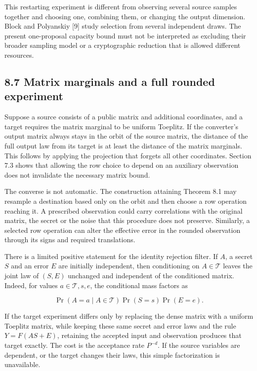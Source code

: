 \documentclass[
]{article}
\begin{document}
This restarting experiment is different from observing several source
samples together and choosing one, combining them, or changing the
output dimension. Block and Polyanskiy {[}9{]} study selection from
several independent draws. The present one-proposal capacity bound must
not be interpreted as excluding their broader sampling model or a
cryptographic reduction that is allowed different resources.

\subsection{8.7 Matrix marginals and a full rounded
experiment}\label{matrix-marginals-and-a-full-rounded-experiment}

Suppose a source consists of a public matrix and additional coordinates,
and a target requires the matrix marginal to be uniform Toeplitz. If the
converter's output matrix always stays in the orbit of the source
matrix, the distance of the full output law from its target is at least
the distance of the matrix marginals. This follows by applying the
projection that forgets all other coordinates. Section 7.3 shows that
allowing the row choice to depend on an auxiliary observation does not
invalidate the necessary matrix bound.

The converse is not automatic. The construction attaining Theorem 8.1
may resample a destination based only on the orbit and then choose a row
operation reaching it. A prescribed observation could carry correlations
with the original matrix, the secret or the noise that this procedure
does not preserve. Similarly, a selected row operation can alter the
effective error in the rounded observation through its signs and
required translations.

There is a limited positive statement for the identity rejection filter.
If \(A\), a secret \(S\) and an error \(E\) are initially independent,
then conditioning on \(A\in\mathcal T\) leaves the joint law of
\((S,E)\) unchanged and independent of the conditioned matrix. Indeed,
for values \(a\in\mathcal T,s,e\), the conditional mass factors as

\[
\Pr(A=a\mid A\in\mathcal T)\Pr(S=s)\Pr(E=e).
\]

If the target experiment differs only by replacing the dense matrix with
a uniform Toeplitz matrix, while keeping these same secret and error
laws and the rule \(Y=F(AS+E)\), retaining the accepted input and
observation produces that target exactly. The cost is the acceptance
rate \(P^{-d}\). If the source variables are dependent, or the target
changes their laws, this simple factorization is unavailable.
\end{document}

